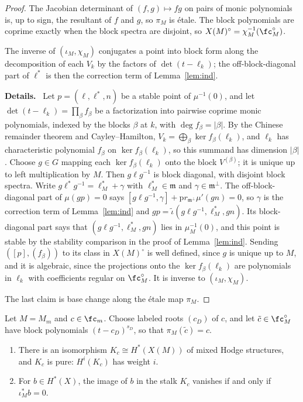 \documentclass[11pt]{amsart}
\newenvironment{details}{\par\color{black!60!green}\noindent\textbf{Details.}\ }{\par}
\begin{document}
\begin{proof}
The Jacobian determinant of $(f,g)\mapsto fg$ on pairs of monic polynomials
is, up to sign, the resultant of $f$ and $g$, so $\pi_M$ is \'etale.  The
block polynomials are coprime exactly when the block spectra are disjoint,
so $X(M)^\circ=\chi_M^{-1}(\fc^\circ_M)$.

The inverse of $(\iota_M,\chi_M)$ conjugates a point into block form along
the decomposition of each $V_k$ by the factors of $\det(t-\ell_k)$; the
off-block-diagonal part of $\ell^*$ is then the correction term of
Lemma~\ref{lem:ind}.
\begin{details}
Let $p=(\ell,\ell^*,n)$ be a
stable point of $\mu^{-1}(0)$, and let $\det(t-\ell_k)=\prod_\beta f_\beta$ be
a factorization into pairwise coprime monic polynomials, indexed by the
blocks $\beta$ at $k$, with $\deg f_\beta=|\beta|$.  By the Chinese remainder
theorem and Cayley--Hamilton, $V_k=\bigoplus_\beta\ker f_\beta(\ell_k)$, and
$\ell_k$ has characteristic polynomial $f_\beta$ on $\ker f_\beta(\ell_k)$, so
this summand has dimension $|\beta|$.  Choose $g\in G$ mapping each
$\ker f_\beta(\ell_k)$ onto the block $V^{(\beta)}$; it is unique up to left
multiplication by $M$.  Then $g\ell g^{-1}$ is block diagonal, with
disjoint block spectra.  Write $g\ell^*g^{-1}=\ell_M^*+\gamma$ with
$\ell_M^*\in\mathfrak m$ and $\gamma\in\mathfrak m^\perp$.  The
off-block-diagonal part of $\mu(gp)=0$ says $[g\ell g^{-1},\gamma]+\mathrm
pr_{\mathfrak m^\perp}\mu'(gn)=0$, so $\gamma$ is the correction term of
Lemma~\ref{lem:ind} and $gp=\tilde\iota(g\ell g^{-1},\ell_M^*,gn)$.  Its
block-diagonal part says that $(g\ell g^{-1},\ell_M^*,gn)$ lies in
$\mu_M^{-1}(0)$, and this point is stable by the stability comparison in the
proof of Lemma~\ref{lem:ind}.  Sending $([p],(f_\beta))$ to its class in
$X(M)^\circ$ is well defined, since $g$ is unique up to $M$, and it is
algebraic, since the projections onto the $\ker f_\beta(\ell_k)$ are
polynomials in $\ell_k$ with coefficients regular on $\fc_M^\circ$.  It is
inverse to $(\iota_M,\chi_M)$.
\end{details}
The last claim is base change along the \'etale map $\pi_M$.
\end{proof}

\begin{lemma}[stalks]\label{lem:stalks}
Let $M=M_m$ and $c\in\fc_m$.  Choose labeled roots $(c_D)$ of $c$, and let
$\tilde c\in\fc^\circ_M$ have block polynomials $(t-c_D)^{s_D}$, so that
$\pi_M(\tilde c)=c$.
\begin{enumerate}[leftmargin=2em]
\item There is an isomorphism $K_c\cong H^*(X(M))$ of mixed Hodge structures,
and $K_c$ is pure: $H^i(K_c)$ has weight $i$.
\item For $b\in H^*(X)$, the image of $b$ in the stalk $K_c$ vanishes if and
only if $\iota_M^*b=0$.
\end{enumerate}
\end{lemma}
\end{document}
